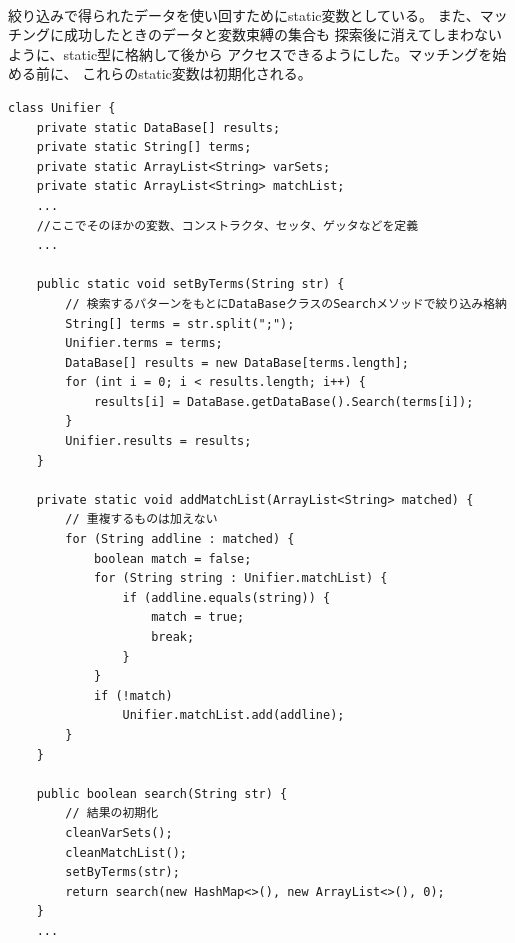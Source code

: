 \documentclass{jarticle}
\begin{document}
    \paragraph{}
    絞り込みで得られたデータを使い回すためにstatic変数としている。
    また、マッチングに成功したときのデータと変数束縛の集合も
    探索後に消えてしまわないように、static型に格納して後から
    アクセスできるようにした。マッチングを始める前に、
    これらのstatic変数は初期化される。
\begin{lstlisting}[caption=Unifierクラスの主要パーツ]
class Unifier {
    private static DataBase[] results;
    private static String[] terms;
    private static ArrayList<String> varSets;
    private static ArrayList<String> matchList;
    ...
    //ここでそのほかの変数、コンストラクタ、セッタ、ゲッタなどを定義
    ...

    public static void setByTerms(String str) {
        // 検索するパターンをもとにDataBaseクラスのSearchメソッドで絞り込み格納
        String[] terms = str.split(";");
        Unifier.terms = terms;
        DataBase[] results = new DataBase[terms.length];
        for (int i = 0; i < results.length; i++) {
            results[i] = DataBase.getDataBase().Search(terms[i]);
        }
        Unifier.results = results;
    }

    private static void addMatchList(ArrayList<String> matched) {
        // 重複するものは加えない
        for (String addline : matched) {
            boolean match = false;
            for (String string : Unifier.matchList) {
                if (addline.equals(string)) {
                    match = true;
                    break;
                }
            }
            if (!match)
                Unifier.matchList.add(addline);
        }
    }

    public boolean search(String str) {
        // 結果の初期化
        cleanVarSets();
        cleanMatchList();
        setByTerms(str);
        return search(new HashMap<>(), new ArrayList<>(), 0);
    }
    ...
\end{lstlisting}
\end{document}
